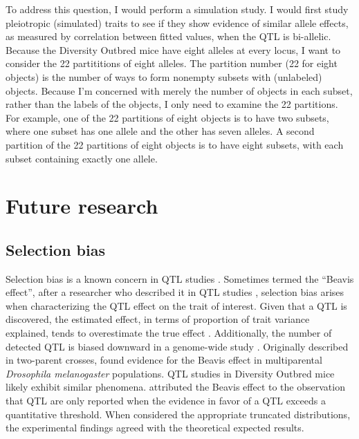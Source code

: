 To address this question, I would perform a simulation study. I would first study pleiotropic (simulated) traits to see if they show evidence of similar allele effects, as measured by correlation between fitted values, when the QTL is bi-allelic. Because the Diversity Outbred mice have eight alleles at every locus, I want to consider the 22 partititions of eight alleles. The partition number (22 for eight objects) is the number of ways to form nonempty subsets with (unlabeled) objects. Because I'm concerned with merely the number of objects in each subset, rather than the labels of the objects, I only need to examine the 22 partitions. For example, one of the 22 partitions of eight objects is to have two subsets, where one subset has one allele and the other has seven alleles. A second partition of the 22 partitions of eight objects is to have eight subsets, with each subset containing exactly one allele.



\section{Future research}


\subsection{Selection bias}

Selection bias is a known concern in QTL studies \citep{lande1990efficiency}. Sometimes termed the ``Beavis effect'', after a researcher who described it in QTL studies \citep{beavis1991quantitative,beavis1994power}, selection bias arises when characterizing the QTL effect on the trait of interest. Given that a QTL is discovered, the estimated effect, in terms of proportion of trait variance explained, tends to overestimate the true effect \citep{broman2009guide}. Additionally, the number of detected QTL is biased downward in a genome-wide study \citep{beavis1998qtl}. Originally described in two-parent crosses, \citet{king2017beavis} found evidence for the Beavis effect in multiparental \emph{Drosophila melanogaster} populations. QTL studies in Diversity Outbred mice likely exhibit similar phenomena. \citet{xu2003theoretical} attributed the Beavis effect to the observation that QTL are only reported when the evidence in favor of a QTL exceeds a quantitative threshold. When \citet{xu2003theoretical} considered the appropriate truncated distributions, the experimental findings agreed with the theoretical expected results. 

